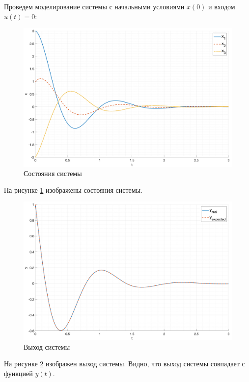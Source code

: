 Проведем моделирование системы с начальными условиями $x(0)$ и входом $u(t) = 0$: 
\begin{figure}
    \centering
    \includegraphics[width=\textwidth]{media/plots/task3_states.png}
    \caption{Состояния системы}
    \label{fig:task3_states}
\end{figure}
На рисунке \ref{fig:task3_states} изображены состояния системы.
\begin{figure}
    \centering
    \includegraphics[width=\textwidth]{media/plots/task3_output.png}
    \caption{Выход системы}
    \label{fig:task3_output}
\end{figure}
На рисунке \ref{fig:task3_output} изображен выход системы. Видно, что выход системы совпадает с функцией $y(t)$.
